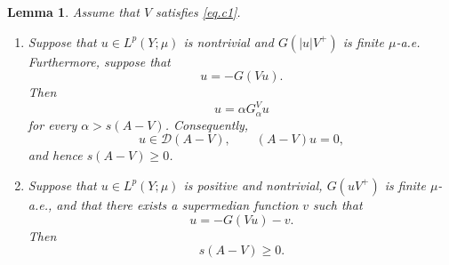 \documentclass[11pt,a4paper,reqno]{amsart}
\newtheorem{lemma}[theorem]{\bf Lemma}
\theoremstyle{definition}
\numberwithin{equation}{section}
\begin{document}
\begin{lemma}
\label{th.pert1lm}
Assume that $V$ satisfies \eqref{eq.c1}.
\begin{enumerate}
\item[(i)] Suppose that $u\in L^p(Y;\mu)$ is nontrivial and
$G(|u|V^+)$ is finite $\mu$-a.e. Furthermore, suppose that
\begin{equation*}
u=-G(Vu).
\end{equation*}
Then
\begin{equation*}
u=\alpha G_\alpha^V u
\end{equation*}
for every $\alpha>s(A-V)$. Consequently,
\begin{equation*}
u\in\mathscr D(A-V),\qquad (A-V)u=0,
\end{equation*}
and hence $s(A-V)\ge0$.

\item[(ii)] Suppose that $u\in L^p(Y;\mu)$ is positive and nontrivial,
$G(uV^+)$ is finite $\mu$-a.e., and that there exists a supermedian
function $v$ such that
\begin{equation*}
u=-G(Vu)-v.
\end{equation*}
Then
\begin{equation*}
s(A-V)\ge0.
\end{equation*}
\end{enumerate}
\end{lemma}
\end{document}
